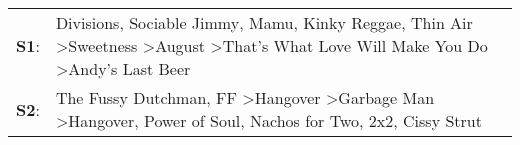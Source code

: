 \begin{supertabular}{p{0.03\textwidth}p{0.92\textwidth}}
 \textbf{S1}:  &  Divisions\textsuperscript{}, \enspace Sociable Jimmy\textsuperscript{}, \enspace Mamu\textsuperscript{}, \enspace Kinky Reggae\textsuperscript{}, \enspace Thin Air\textsuperscript{} \textgreater \enspace Sweetness\textsuperscript{} \textgreater \enspace August\textsuperscript{} \textgreater \enspace That's What Love Will Make You Do\textsuperscript{} \textgreater \enspace Andy's Last Beer\textsuperscript{}  \enspace  \\
 \textbf{S2}:  &                                     The Fussy Dutchman\textsuperscript{}, \enspace FF\textsuperscript{} \textgreater \enspace Hangover\textsuperscript{} \textgreater \enspace Garbage Man\textsuperscript{} \textgreater \enspace Hangover\textsuperscript{}, \enspace Power of Soul\textsuperscript{}, \enspace Nachos for Two\textsuperscript{}, \enspace 2x2\textsuperscript{}, \enspace Cissy Strut\textsuperscript{}  \enspace  \\
\end{supertabular}
